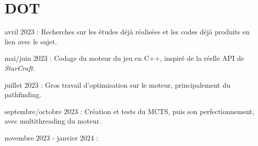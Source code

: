 \documentclass[a4paper, 12pt]{article}
\begin{document}


\section*{DOT}
\begin{enumerate}[label=\textbf{[\arabic*]}]
    \item avril 2023 : Recherches sur les études déjà réalisées et les codes déjà produits en lien avec le sujet.
    \item mai/juin 2023 : Codage du moteur du jeu en C++, inspiré de la réelle API de \emph{StarCraft}.
    \item juillet 2023 : Gros travail d'optimisation sur le moteur, principalement du pathfinding.
    \item septembre/octobre 2023 : Création et tests du MCTS, puis son perfectionnement, avec multithreading du moteur.
    \item novembre 2023 - janvier 2024 :
\end{enumerate}
\end{document}
